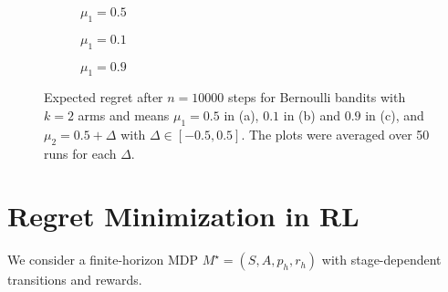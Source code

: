 \documentclass[a4paper]{article}
\begin{document}
\begin{figure}[H]
	\centering
	\begin{subfigure}[h]{\textwidth}
		\begin{center}
			
		\end{center}
		\caption{$\mu_1 = 0.5$}
	\end{subfigure}
	\bigskip
	\begin{subfigure}[h]{0.49\textwidth}
		\begin{center}
			
		\end{center}
		\caption{$\mu_1 = 0.1$}
	\end{subfigure}
	\hfill
	\begin{subfigure}[h]{0.49\textwidth}
		\begin{center}
			
		\end{center}
		\caption{$\mu_1 = 0.9$}
	\end{subfigure}
	\caption{Expected regret after $n=10000$ steps for Bernoulli bandits with $k=2$ arms and means $\mu_1 = 0.5$ in (a), $0.1$ in (b) and $0.9$ in (c), and $\mu_2 = 0.5 + \Delta$ with $\Delta \in [-0.5,0.5]$. The plots were averaged over 50 runs for each $\Delta$.}
	\label{fig:regret}
\end{figure}

\section{Regret Minimization in RL}

We consider a finite-horizon MDP $M^\star = (S, A, p_h, r_h)$ with stage-dependent transitions and rewards.
\end{document}
